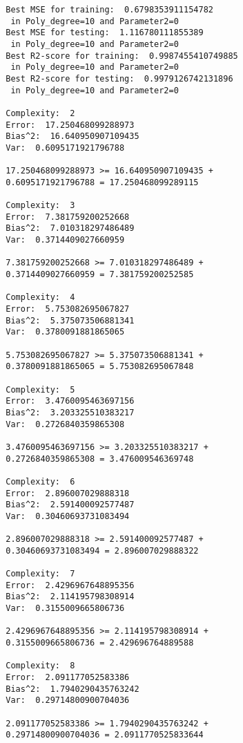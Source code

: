 \begin{verbatim}
        Best MSE for training:  0.6798353911154782 
         in Poly_degree=10 and Parameter2=0
        Best MSE for testing:  1.116780111855389 
         in Poly_degree=10 and Parameter2=0
        Best R2-score for training:  0.9987455410749885 
         in Poly_degree=10 and Parameter2=0
        Best R2-score for testing:  0.9979126742131896 
         in Poly_degree=10 and Parameter2=0
         
        Complexity:  2
        Error:  17.250468099288973
        Bias^2:  16.640950907109435
        Var:  0.6095171921796788
        
        17.250468099288973 >= 16.640950907109435 +
        0.6095171921796788 = 17.250468099289115
        
        Complexity:  3
        Error:  7.381759200252668
        Bias^2:  7.010318297486489
        Var:  0.3714409027660959
        
        7.381759200252668 >= 7.010318297486489 +
        0.3714409027660959 = 7.381759200252585
        
        Complexity:  4
        Error:  5.753082695067827
        Bias^2:  5.375073506881341
        Var:  0.3780091881865065
        
        5.753082695067827 >= 5.375073506881341 +
        0.3780091881865065 = 5.753082695067848
        
        Complexity:  5
        Error:  3.4760095463697156
        Bias^2:  3.203325510383217
        Var:  0.2726840359865308
        
        3.4760095463697156 >= 3.203325510383217 +
        0.2726840359865308 = 3.476009546369748
        
        Complexity:  6
        Error:  2.896007029888318
        Bias^2:  2.591400092577487
        Var:  0.30460693731083494
        
        2.896007029888318 >= 2.591400092577487 +
        0.30460693731083494 = 2.896007029888322
        
        Complexity:  7
        Error:  2.4296967648895356
        Bias^2:  2.114195798308914
        Var:  0.3155009665806736
        
        2.4296967648895356 >= 2.114195798308914 +
        0.3155009665806736 = 2.429696764889588
        
        Complexity:  8
        Error:  2.091177052583386
        Bias^2:  1.7940290435763242
        Var:  0.29714800900704036
        
        2.091177052583386 >= 1.7940290435763242 +
        0.29714800900704036 = 2.0911770525833644
        

\end{verbatim}
